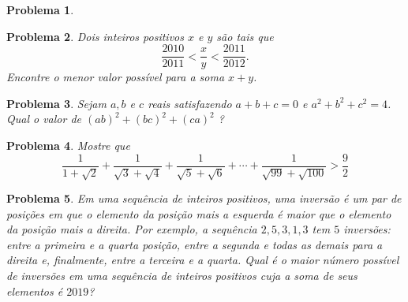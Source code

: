 \documentclass{hipatia}
\newtheorem{problem*}{Problema}
\begin{document}
\begin{problem*}
\begin{center}


	\end{center}    
\end{problem*}


\begin{problem*}
Dois inteiros positivos $x$ e $y$ são tais que 
$$\dfrac{2010}{2011} < \dfrac{x}{y} < \dfrac{2011}{2012}.$$
Encontre o menor valor possível para a soma $x+y$.
 
\end{problem*}

\begin{problem*}

Sejam $a, b$ e $c$ reais satisfazendo $a+b+c = 0$ e $a^2 + b^2 + c^2 = 4$. Qual o valor de $(ab)^2 + (bc)^2 + (ca)^2$ ?


	
\end{problem*}

\begin{problem*}

Mostre que $$\frac{1}{1+\sqrt{2}} + \frac{1}{\sqrt{3}+\sqrt{4}} + \frac{1}{\sqrt{5}+\sqrt{6}} + \cdots + \frac{1}{\sqrt{99}+\sqrt{100}} > \frac{9}{2}$$
	
\end{problem*}


\begin{problem*}
Em uma sequência de inteiros positivos, uma {\it inversão} é um par de posições em que o elemento da posição mais a esquerda é maior que o elemento da posição mais a direita. Por exemplo, a sequência $2,5,3,1,3$ tem $5$ inversões: entre a primeira e a quarta posição, entre a segunda e todas as demais para a direita e, finalmente, entre a terceira e a quarta. Qual é o maior número possível de inversões em uma sequência de inteiros positivos cuja a soma de seus elementos é $2019$?    
\end{problem*}
\end{document}

